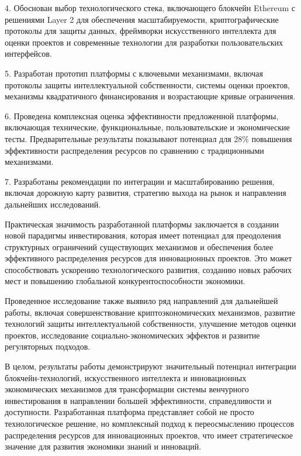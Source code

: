 \documentclass[
    14pt,
    specialist,
    candidate, %
    subf, %
    href,
    dotsinheaders=false
]{disser}
\begin{document}
4. Обоснован выбор технологического стека, включающего блокчейн Ethereum с решениями Layer 2 для обеспечения масштабируемости, криптографические протоколы для защиты данных, фреймворки искусственного интеллекта для оценки проектов и современные технологии для разработки пользовательских интерфейсов.

5. Разработан прототип платформы с ключевыми механизмами, включая протоколы защиты интеллектуальной собственности, системы оценки проектов, механизмы квадратичного финансирования и возрастающие кривые ограничения.

6. Проведена комплексная оценка эффективности предложенной платформы, включающая технические, функциональные, пользовательские и экономические тесты. Предварительные результаты показывают потенциал для 28\% повышения эффективности распределения ресурсов по сравнению с традиционными механизмами.

7. Разработаны рекомендации по интеграции и масштабированию решения, включая дорожную карту развития, стратегию выхода на рынок и направления дальнейших исследований.

Практическая значимость разработанной платформы заключается в создании новой парадигмы инвестирования, которая имеет потенциал для преодоления структурных ограничений существующих механизмов и обеспечения более эффективного распределения ресурсов для инновационных проектов. Это может способствовать ускорению технологического развития, созданию новых рабочих мест и повышению глобальной конкурентоспособности экономики.

Проведенное исследование также выявило ряд направлений для дальнейшей работы, включая совершенствование криптоэкономических механизмов, развитие технологий защиты интеллектуальной собственности, улучшение методов оценки проектов, исследование социально-экономических эффектов и развитие регуляторных подходов.

В целом, результаты работы демонстрируют значительный потенциал интеграции блокчейн-технологий, искусственного интеллекта и инновационных экономических механизмов для трансформации системы венчурного инвестирования в направлении большей эффективности, справедливости и доступности. Разработанная платформа представляет собой не просто технологическое решение, но комплексный подход к переосмыслению процессов распределения ресурсов для инновационных проектов, что имеет стратегическое значение для развития экономики знаний и инноваций.

\renewcommand{\bibname}{\fontsize{14pt}{21pt}\selectfont СПИСОК ИСПОЛЬЗОВАННЫХ ИСТОЧНИКОВ}


\end{document}
